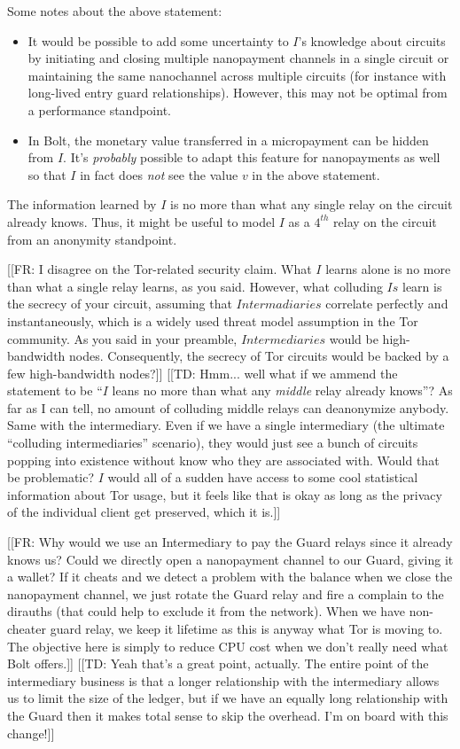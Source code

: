 \documentclass{article}
\newcommand{\flo}[1]{ {\color{blue} [[FR: #1]]}}
\newcommand{\thi}[1]{ {\color{red} [[TD: #1]]}}
\begin{document}
Some notes about the above statement:
\begin{itemize}
\item It would be possible to add some uncertainty to $I$'s knowledge about circuits by initiating and closing multiple nanopayment channels in a single circuit or maintaining the same nanochannel across multiple circuits (for instance with long-lived entry guard relationships). However, this may not be optimal from a performance standpoint.
\item In Bolt, the monetary value transferred in a micropayment can be hidden from $I$. It's \emph{probably} possible to adapt this feature for nanopayments as well so that $I$ in fact does \emph{not} see the value $v$ in the above statement.
\end{itemize}
The information learned by $I$ is no more than what any single relay on the circuit already knows. Thus, it might be useful to model $I$ as a $4^{th}$ relay on the circuit from an anonymity standpoint.

\flo{I disagree on the Tor-related security claim. What $I$ learns alone is no more than what a single relay learns, as you said. However, what colluding $Is$ learn is the secrecy of your circuit, assuming that $Intermadiaries$ correlate perfectly and instantaneously, which is a widely used threat model assumption in the Tor community. As you said in your preamble, $Intermediaries$ would be high-bandwidth nodes. Consequently, the secrecy of Tor circuits would be backed by a few high-bandwidth nodes?}
\thi{Hmm... well what if we ammend the statement to be ``$I$ leans no more than what any \emph{middle} relay already knows''? As far as I can tell, no amount of colluding middle relays can deanonymize anybody. Same with the intermediary. Even if we have a single intermediary (the ultimate ``colluding intermediaries'' scenario), they would just see a bunch of circuits popping into existence without know who they are associated with. Would that be problematic? $I$ would all of a sudden have access to some cool statistical information about Tor usage, but it feels like that is okay as long as the privacy of the individual client get preserved, which it is.}

\flo{Why would we use an Intermediary to pay the Guard relays since it already knows us? Could we directly open a nanopayment channel to our Guard, giving it a wallet? If it cheats and we detect a problem with the balance when we close the nanopayment channel, we just rotate the Guard relay and fire a complain to the dirauths (that could help to exclude it from the network). When we have non-cheater guard relay, we keep it lifetime as this is anyway what Tor is moving to. The objective here is simply to reduce CPU cost when we don't really need what Bolt offers.}
\thi{Yeah that's a great point, actually. The entire point of the intermediary business is that a longer relationship with the intermediary allows us to limit the size of the ledger, but if we have an equally long relationship with the Guard then it makes total sense to skip the overhead. I'm on board with this change!}
\end{document}
